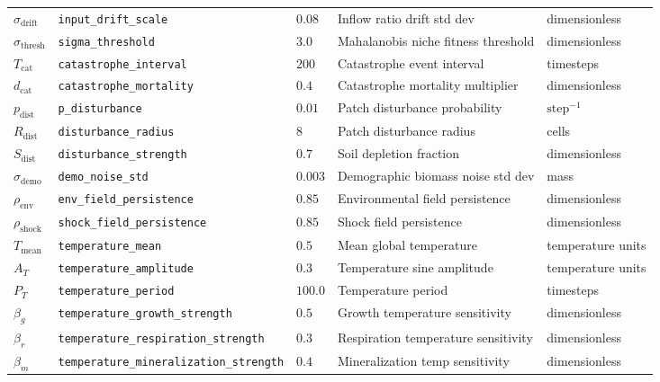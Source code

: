 \documentclass[11pt,a4paper]{article}
\begin{document}
\begin{longtable}{lllp{4.5cm}l}
$\sigma_{\text{drift}}$ & \texttt{input\_drift\_scale} & $0.08$ & Inflow ratio drift std dev & dimensionless \\
$\sigma_{\text{thresh}}$ & \texttt{sigma\_threshold} & $3.0$ & Mahalanobis niche fitness threshold & dimensionless \\
$T_{\text{cat}}$ & \texttt{catastrophe\_interval} & $200$ & Catastrophe event interval & timesteps \\
$d_{\text{cat}}$ & \texttt{catastrophe\_mortality} & $0.4$ & Catastrophe mortality multiplier & dimensionless \\
$p_{\text{dist}}$ & \texttt{p\_disturbance} & $0.01$ & Patch disturbance probability & $\text{step}^{-1}$ \\
$R_{\text{dist}}$ & \texttt{disturbance\_radius} & $8$ & Patch disturbance radius & cells \\
$S_{\text{dist}}$ & \texttt{disturbance\_strength} & $0.7$ & Soil depletion fraction & dimensionless \\
$\sigma_{\text{demo}}$ & \texttt{demo\_noise\_std} & $0.003$ & Demographic biomass noise std dev & mass \\
$\rho_{\text{env}}$ & \texttt{env\_field\_persistence} & $0.85$ & Environmental field persistence & dimensionless \\
$\rho_{\text{shock}}$ & \texttt{shock\_field\_persistence} & $0.85$ & Shock field persistence & dimensionless \\
$T_{\text{mean}}$ & \texttt{temperature\_mean} & $0.5$ & Mean global temperature & temperature units \\
$A_T$ & \texttt{temperature\_amplitude} & $0.3$ & Temperature sine amplitude & temperature units \\
$P_T$ & \texttt{temperature\_period} & $100.0$ & Temperature period & timesteps \\
$\beta_g$ & \texttt{temperature\_growth\_strength} & $0.5$ & Growth temperature sensitivity & dimensionless \\
$\beta_r$ & \texttt{temperature\_respiration\_strength} & $0.3$ & Respiration temperature sensitivity & dimensionless \\
$\beta_m$ & \texttt{temperature\_mineralization\_strength} & $0.4$ & Mineralization temp sensitivity & dimensionless \\
\bottomrule
\end{longtable}
\end{document}
